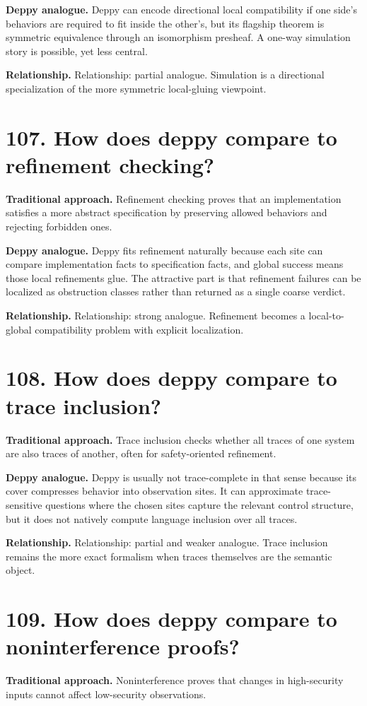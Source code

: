 \documentclass[11pt,openany]{book}
\begin{document}
\textbf{Deppy analogue.} Deppy can encode directional local compatibility if one side's behaviors are required to fit inside the other's, but its flagship theorem is symmetric equivalence through an isomorphism presheaf. A one-way simulation story is possible, yet less central.

\textbf{Relationship.} Relationship: partial analogue. Simulation is a directional specialization of the more symmetric local-gluing viewpoint.

\section*{107. How does deppy compare to refinement checking?}
\textbf{Traditional approach.} Refinement checking proves that an implementation satisfies a more abstract specification by preserving allowed behaviors and rejecting forbidden ones.

\textbf{Deppy analogue.} Deppy fits refinement naturally because each site can compare implementation facts to specification facts, and global success means those local refinements glue. The attractive part is that refinement failures can be localized as obstruction classes rather than returned as a single coarse verdict.

\textbf{Relationship.} Relationship: strong analogue. Refinement becomes a local-to-global compatibility problem with explicit localization.

\section*{108. How does deppy compare to trace inclusion?}
\textbf{Traditional approach.} Trace inclusion checks whether all traces of one system are also traces of another, often for safety-oriented refinement.

\textbf{Deppy analogue.} Deppy is usually not trace-complete in that sense because its cover compresses behavior into observation sites. It can approximate trace-sensitive questions where the chosen sites capture the relevant control structure, but it does not natively compute language inclusion over all traces.

\textbf{Relationship.} Relationship: partial and weaker analogue. Trace inclusion remains the more exact formalism when traces themselves are the semantic object.

\section*{109. How does deppy compare to noninterference proofs?}
\textbf{Traditional approach.} Noninterference proves that changes in high-security inputs cannot affect low-security observations.
\end{document}
